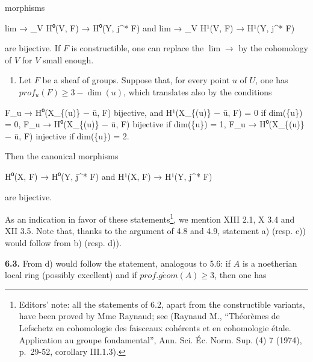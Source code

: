 \documentclass[
  11pt,
  a4paper,
]{book}
\newenvironment{Shaded}{}{}
\newcommand{\NormalTok}[1]{#1}
\providecommand{\tightlist}{%
  \setlength{\itemsep}{0pt}\setlength{\parskip}{0pt}}
\begin{document}
morphisms

\begin{Shaded}
\begin{Highlighting}[]
\NormalTok{lim → \_V H⁰(V, F) → H⁰(Y, j\^{}* F)  and  lim → \_V H¹(V, F) → H¹(Y, j\^{}* F)}
\end{Highlighting}
\end{Shaded}

are bijective. If \(F\) is constructible, one can replace the
\(\lim \to\) by the cohomology of \(V\) for \(V\) small enough.

\begin{enumerate}
\def\labelenumi{\alph{enumi})}
\setcounter{enumi}{3}
\tightlist
\item
  Let \(F\) be a sheaf of groups. Suppose that, for every point \(u\) of
  \(U\), one has \(prof_{u}(F) \geqslant 3 -
  \dim({u})\), which translates also by the conditions
\end{enumerate}

\begin{Shaded}
\begin{Highlighting}[]
\NormalTok{F\_u → H⁰(X\_\{(u)\} − ū, F) bijective, and H¹(X\_\{(u)\} − ū, F) = 0 if dim(\{u\}) = 0,}
\NormalTok{F\_u → H⁰(X\_\{(u)\} − ū, F) bijective if dim(\{u\}) = 1,}
\NormalTok{F\_u → H⁰(X\_\{(u)\} − ū, F) injective if dim(\{u\}) = 2.}
\end{Highlighting}
\end{Shaded}

Then the canonical morphisms

\begin{Shaded}
\begin{Highlighting}[]
\NormalTok{H⁰(X, F) → H⁰(Y, j\^{}* F)  and  H¹(X, F) → H¹(Y, j\^{}* F)}
\end{Highlighting}
\end{Shaded}

are bijective.

As an indication in favor of these statements\footnote{Editors' note:
  all the statements of 6.2, apart from the constructible variants, have
  been proved by Mme Raynaud; see (Raynaud M., ``Théorèmes de Lefschetz
  en cohomologie des faisceaux cohérents et en cohomologie étale.
  Application au groupe fondamental'', Ann. Sci. Éc. Norm. Sup. (4) 7
  (1974), p.~29-52, corollary III.1.3).}, we mention XIII 2.1, X 3.4 and
XII 3.5. Note that, thanks to the argument of 4.8 and 4.9, statement a)
(resp. c)) would follow from b) (resp. d)).

\textbf{6.3.} From d) would follow the statement, analogous to 5.6: if
\(A\) is a noetherian local ring (possibly excellent) and if
\(prof.g\acute{e}om(A) \geqslant 3\), then one has
\end{document}
